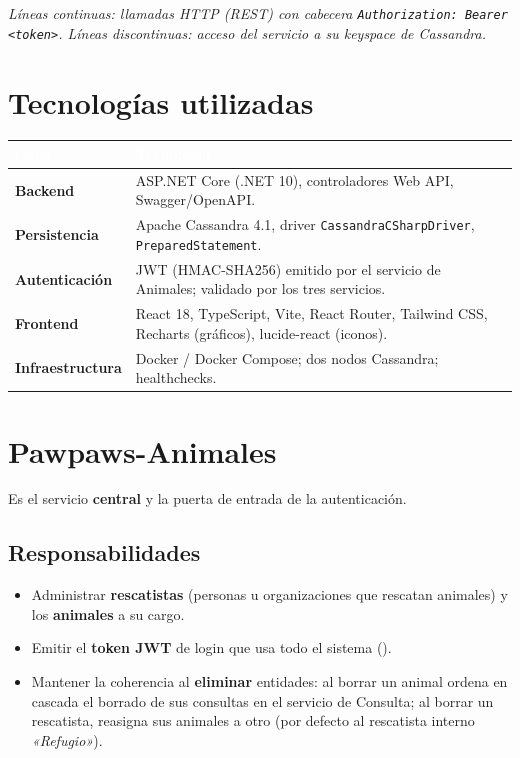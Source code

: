 \documentclass[11pt,a4paper]{article}
\begin{document}
\noindent
\textit{Líneas continuas: llamadas HTTP (REST) con cabecera \texttt{Authorization:
Bearer <token>}. Líneas discontinuas: acceso del servicio a su keyspace de
Cassandra.}

\section{Tecnologías utilizadas}

\begin{center}
\begin{tabular}{>{\bfseries}p{3.2cm} p{10.5cm}}
\toprule
\rowcolor{moss}\textcolor{white}{\textbf{Capa}} & \textcolor{white}{\textbf{Tecnología}} \\
\midrule
Backend       & ASP.NET Core (.NET 10), controladores Web API, Swagger/OpenAPI. \\
Persistencia  & Apache Cassandra 4.1, driver \texttt{CassandraCSharpDriver}, \texttt{PreparedStatement}. \\
Autenticación & JWT (HMAC-SHA256) emitido por el servicio de Animales; validado por los tres servicios. \\
Frontend      & React 18, TypeScript, Vite, React Router, Tailwind CSS, Recharts (gráficos), lucide-react (iconos). \\
Infraestructura & Docker / Docker Compose; dos nodos Cassandra; healthchecks. \\
\bottomrule
\end{tabular}
\end{center}

\section{Pawpaws-Animales}

Es el servicio \textbf{central} y la puerta de entrada de la autenticación.

\subsection{Responsabilidades}
\begin{itemize}[leftmargin=1.4em]
  \item Administrar \textbf{rescatistas} (personas u organizaciones que rescatan
        animales) y los \textbf{animales} a su cargo.
  \item Emitir el \textbf{token JWT} de login que usa todo el sistema
        ().
  \item Mantener la coherencia al \textbf{eliminar} entidades: al borrar un animal
        ordena en cascada el borrado de sus consultas en el servicio de Consulta;
        al borrar un rescatista, reasigna sus animales a otro (por defecto al
        rescatista interno \emph{«Refugio»}).
\end{itemize}
\end{document}
